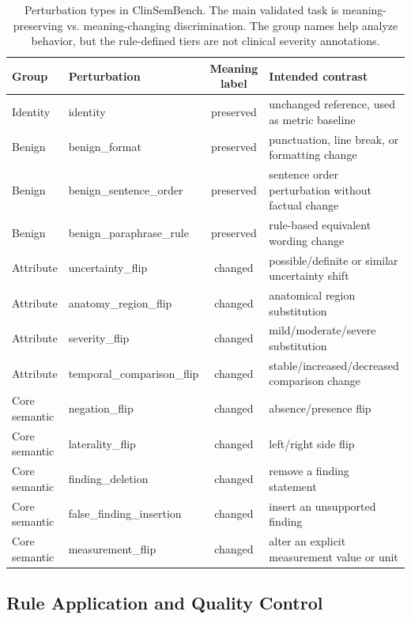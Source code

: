 \documentclass[11pt]{article}
\newcommand{\bench}{ClinSemBench\xspace}
\newcommand{\pres}{meaning-preserving\xspace}
\newcommand{\chg}{meaning-changing\xspace}
\begin{document}
\begin{table}[t]
\centering
\small
\begin{tabular}{llcl}
\toprule
\textbf{Group} & \textbf{Perturbation} & \textbf{Meaning label} & \textbf{Intended contrast} \\
\midrule
Identity & identity & preserved & unchanged reference, used as metric baseline \\
Benign & benign\_format & preserved & punctuation, line break, or formatting change \\
Benign & benign\_sentence\_order & preserved & sentence order perturbation without factual change \\
Benign & benign\_paraphrase\_rule & preserved & rule-based equivalent wording change \\
Attribute & uncertainty\_flip & changed & possible/definite or similar uncertainty shift \\
Attribute & anatomy\_region\_flip & changed & anatomical region substitution \\
Attribute & severity\_flip & changed & mild/moderate/severe substitution \\
Attribute & temporal\_comparison\_flip & changed & stable/increased/decreased comparison change \\
Core semantic & negation\_flip & changed & absence/presence flip \\
Core semantic & laterality\_flip & changed & left/right side flip \\
Core semantic & finding\_deletion & changed & remove a finding statement \\
Core semantic & false\_finding\_insertion & changed & insert an unsupported finding \\
Core semantic & measurement\_flip & changed & alter an explicit measurement value or unit \\
\bottomrule
\end{tabular}
\caption{Perturbation types in \bench. The main validated task is \pres vs. \chg discrimination. The group names help analyze behavior, but the rule-defined tiers are not clinical severity annotations.}
\label{tab:perturbations}
\end{table}

\subsection{Rule Application and Quality Control}
\end{document}
